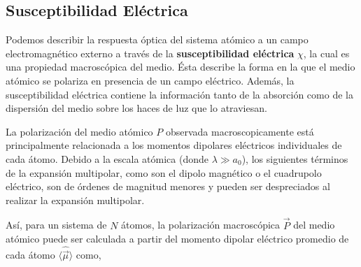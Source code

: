 \subsection{Susceptibilidad Eléctrica}
Podemos describir la respuesta óptica del sistema atómico a un campo electromagnético externo a través de la \textbf{susceptibilidad eléctrica} $\chi$, la cual es una propiedad macroscópica del medio. Ésta describe la forma en la que el medio atómico se polariza en presencia de un campo eléctrico. Además, la susceptibilidad eléctrica contiene la información tanto de la absorción como de la dispersión del medio sobre los haces de luz que lo atraviesan.

La polarización del medio atómico $P$ observada macroscopicamente está principalmente relacionada a los momentos dipolares eléctricos individuales de cada átomo. Debido a la escala atómica (donde $\lambda \gg a_0$), los siguientes términos de la expansión multipolar, como son el  dipolo magnético o el cuadrupolo eléctrico, son de órdenes de magnitud menores y pueden ser despreciados al realizar la expansión multipolar. 

Así, para un sistema de $N$ átomos, la polarización macroscópica $\vec{P}$ del medio atómico puede ser calculada a partir del momento dipolar eléctrico promedio de cada átomo $\langle \hat{\vec{\mu}} \rangle$ como,

